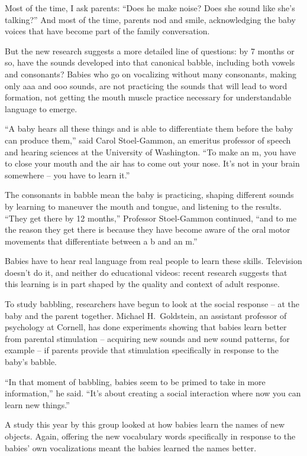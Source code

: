﻿\documentclass[12pt]{article}
\begin{document}
Most of the time, I ask parents: ``Does he make noise? Does she sound like she's talking?'' And most
of the time, parents nod and smile, acknowledging the baby voices that have become part of the
family conversation.

But the new research suggests a more detailed line of questions: by 7 months or so, have the sounds
developed into that canonical babble, including both vowels and consonants? Babies who go on
vocalizing without many consonants, making only aaa and ooo sounds, are not practicing the sounds
that will lead to word formation, not getting the mouth muscle practice necessary for understandable
language to emerge.

``A baby hears all these things and is able to differentiate them before the baby can produce
them,'' said Carol Stoel-Gammon, an emeritus professor of speech and hearing sciences at the
University of Washington. ``To make an m, you have to close your mouth and the air has to come out
your nose. It's not in your brain somewhere -- you have to learn it.''

The consonants in babble mean the baby is practicing, shaping different sounds by learning to
maneuver the mouth and tongue, and listening to the results. ``They get there by 12 months,''
Professor Stoel-Gammon continued, ``and to me the reason they get there is because they have become
aware of the oral motor movements that differentiate between a b and an m.''

Babies have to hear real language from real people to learn these skills. Television doesn't do it,
and neither do educational videos: recent research suggests that this learning is in part shaped by
the quality and context of adult response.

To study babbling, researchers have begun to look at the social response -- at the baby and the
parent together. Michael H.~Goldstein, an assistant professor of psychology at Cornell, has done
experiments showing that babies learn better from parental stimulation -- acquiring new sounds and
new sound patterns, for example -- if parents provide that stimulation specifically in response to
the baby's babble.

``In that moment of babbling, babies seem to be primed to take in more information,'' he said.
``It's about creating a social interaction where now you can learn new things.''

A study this year by this group looked at how babies learn the names of new objects. Again, offering
the new vocabulary words specifically in response to the babies' own vocalizations meant the babies
learned the names better.
\end{document}

